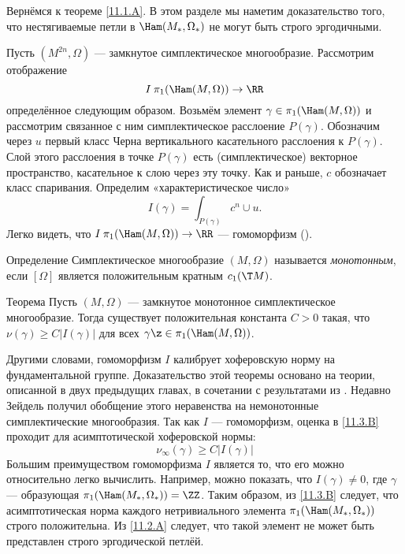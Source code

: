 Вернёмся к теореме \ref{11.1.A}.
В этом разделе мы наметим доказательство того, что нестягиваемые петли в $\Ham(M_\ast, \Omega_\ast)$ не могут быть строго эргодичными.

Пусть $(M^{2n},\Omega)$ --- замкнутое симплектическое многообразие.
Рассмотрим отображение
\[I\:\pi_1(\Ham(M,\Omega))\to\RR\]
определённое следующим образом.
Возьмём элемент $\gamma\in\pi_1(\Ham(M,\Omega))$ и рассмотрим связанное с ним симплектическое расслоение $P(\gamma)$.
Обозначим через $u$ первый класс Черна вертикального касательного расслоения к $P(\gamma)$.
Слой этого расслоения в точке $P(\gamma)$ есть (симплектическое) векторное пространство, касательное к слою через эту точку.
Как и раньше, $c$ обозначает класс спаривания.
Определим «характеристическое число» 
\[I(\gamma)= \int_{P(\gamma)} c^n\cup u.\]
Легко видеть, что $I\: \pi_1(\Ham(M, \Omega))\to \RR$ --- гомоморфизм (\cite{P6,LMP2}).

\begin{ex}{Определение}\label{11.3.A} Симплектическое многообразие $(M,\Omega)$ называется \emph{монотонным}, если $[\Omega]$ является положительным кратным $c_1 (\T M)$.
\end{ex}

\begin{thm}[(\cite{P6})]{Теорема}\label{11.3.B}
Пусть $(M, \Omega)$ --- замкнутое монотонное симплектическое многообразие.
Тогда существует положительная константа $C>0$ такая, что
$\nu(\gamma)\ge C|I(\gamma)|$ для всех $\gamma\z\in\pi_1(\Ham(M,\Omega))$.
\end{thm}

Другими словами, гомоморфизм $I$ калибрует хоферовскую норму на фундаментальной группе.
Доказательство этой теоремы основано на теории, описанной в двух предыдущих главах, в сочетании с результатами из \cite{Se}.
Недавно Зейдель получил обобщение этого неравенства на немонотонные симплектические многообразия.
Так как $I$ --- гомоморфизм, оценка в \ref{11.3.B} проходит для асимптотической хоферовской нормы: 
\[\nu_\infty(\gamma)\ge C|I(\gamma)|\]
Большим преимуществом гомоморфизма $I$ является то, что его можно относительно легко вычислить.
Например, можно показать, что $I(\gamma) \ne 0$, где $\gamma$ --- образующая $\pi_1(\Ham(M_\ast,\Omega_\ast)) = \ZZ$.
Таким образом, из \ref{11.3.B} следует, что асимптотическая норма каждого нетривиального элемента $\pi_1(\Ham(M_\ast, \Omega_\ast))$ строго положительна.
Из \ref{11.2.A} следует, что такой элемент не может быть представлен строго эргодической петлёй.
